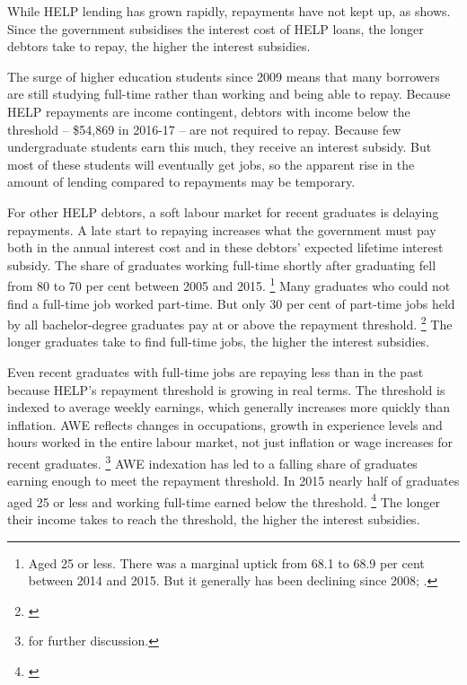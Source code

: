 \documentclass[embargoed]{grattan}
\begin{document}
While \gls{HELP} lending has grown rapidly, repayments have not kept up, as  shows.
Since the government subsidises the interest cost of \gls{HELP} loans, the longer debtors take to repay, the higher the interest subsidies.

The surge of higher education students since 2009 means that many borrowers are still studying full-time rather than working and being able to repay.
Because \gls{HELP} repayments are income contingent, debtors with income below the threshold -- \$54,869 in 2016-17 -- are not required to repay.
Because few undergraduate students earn this much, they receive an interest subsidy.
But most of these students will eventually get jobs, so the apparent rise in the amount of lending compared to repayments may be temporary.

For other \gls{HELP} debtors, a soft labour market for recent graduates is delaying repayments.
A late start to repaying increases what the government must pay both in the annual interest cost and in these debtors' expected lifetime interest subsidy.
The share of graduates working full-time shortly after graduating fell from 80 to 70 per cent between 2005 and 2015.%
\footnote{Aged 25 or less.
There was a marginal uptick from 68.1 to 68.9 per cent between 2014 and 2015.
But it generally has been declining since 2008; \textcite[][figure 1]{GCA2015GradStatsemploymentsalary}.} Many graduates who could not find a full-time job worked part-time.
But only 30 per cent of part-time jobs held by all bachelor-degree graduates pay at or above the repayment threshold.%
\footnote{\textcite[][figure 7]{Norton2016HELPfuturefairer}} The longer graduates take to find full-time jobs, the higher the interest subsidies.

Even recent graduates with full-time jobs are repaying less than in the past because \gls{HELP}'s repayment threshold is growing in real terms.
The threshold is indexed to average weekly earnings, which generally increases more quickly than inflation.
\gls{AWE} reflects changes in occupations, growth in experience levels and hours worked in the entire labour market, not just inflation or wage increases for recent graduates.%
\footnote{\textcite[][chapter 8]{Norton2016HELPfuturefairer} for further discussion.} \gls{AWE} indexation has led to a falling share of graduates earning enough to meet the repayment threshold.
In 2015 nearly half of graduates aged 25 or less and working full-time earned below the threshold.%
\footnote{\textcite{GCA2015GradStatsemploymentsalary}} The longer their income takes to reach the threshold, the higher the interest subsidies.
\end{document}
